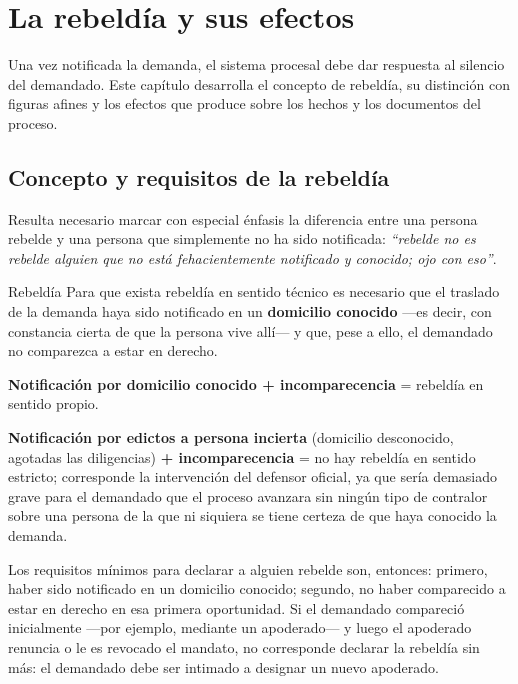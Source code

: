 \documentclass[12pt,oneside]{book}
\begin{document}
\chapter[La rebeldía y sus efectos]{La rebeldía y sus efectos}
\label{ch:rebeldia}

Una vez notificada la demanda, el sistema procesal debe dar respuesta al silencio del demandado. Este capítulo desarrolla el concepto de rebeldía, su distinción con figuras afines y los efectos que produce sobre los hechos y los documentos del proceso.

\section{Concepto y requisitos de la rebeldía}

Resulta necesario marcar con especial énfasis la diferencia entre una persona rebelde y una persona que simplemente no ha sido notificada: \textit{``rebelde no es rebelde alguien que no está fehacientemente notificado y conocido; ojo con eso''}.

\begin{definition}{Rebeldía}
Para que exista rebeldía en sentido técnico es necesario que el traslado de la demanda haya sido notificado en un \textbf{domicilio conocido} —es decir, con constancia cierta de que la persona vive allí— y que, pese a ello, el demandado no comparezca a estar en derecho.
\end{definition}

\begin{important}
\textbf{Notificación por domicilio conocido + incomparecencia} = rebeldía en sentido propio.

\textbf{Notificación por edictos a persona incierta} (domicilio desconocido, agotadas las diligencias) \textbf{+ incomparecencia} = no hay rebeldía en sentido estricto; corresponde la intervención del defensor oficial, ya que sería demasiado grave para el demandado que el proceso avanzara sin ningún tipo de contralor sobre una persona de la que ni siquiera se tiene certeza de que haya conocido la demanda.
\end{important}

Los requisitos mínimos para declarar a alguien rebelde son, entonces: primero, haber sido notificado en un domicilio conocido; segundo, no haber comparecido a estar en derecho en esa primera oportunidad. Si el demandado compareció inicialmente —por ejemplo, mediante un apoderado— y luego el apoderado renuncia o le es revocado el mandato, no corresponde declarar la rebeldía sin más: el demandado debe ser intimado a designar un nuevo apoderado.
\end{document}
